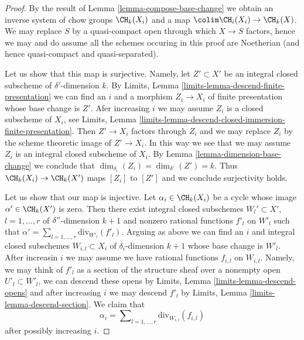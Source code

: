 \begin{proof}
By the result of Lemma \ref{lemma-compose-base-change} we obtain
an inverse system of chow groups $\CH_k(X_i)$ and a map
$\colim \CH_i(X_i) \to \CH_k(X)$.
We may replace $S$ by a quasi-compact open through which $X \to S$
factors, hence we may and do assume all the schemes occuring in
this proof are Noetherian (and hence quasi-compact and quasi-separated).

\medskip\noindent
Let us show that this map is surjective. Namely, let $Z' \subset X'$
be an integral closed subscheme of $\delta'$-dimension $k$. By
Limits, Lemma \ref{limits-lemma-descend-finite-presentation}
we can find an $i$ and a morphism $Z_i \to X_i$ of finite presentation
whose base change is $Z'$. Afer increasing $i$ we may assume $Z_i$
is a closed subscheme of $X_i$, see
Limits, Lemma \ref{limits-lemma-descend-closed-immersion-finite-presentation}.
Then $Z' \to X_i$ factors through $Z_i$ and we may replace $Z_i$
by the scheme theoretic image of $Z' \to X_i$. In this way we see
that we may assume $Z_i$ is an integral closed subscheme of $X_i$.
By Lemma \ref{lemma-dimension-base-change} we conclude that
$\dim_{\delta_i}(Z_i) = \dim_{\delta'}(Z') = k$.
Thus $\CH_k(X_i) \to \CH_k(X')$ maps $[Z_i]$ to $[Z']$ and
we conclude surjectivity holds.

\medskip\noindent
Let us show that our map is injective. Let $\alpha_i \in \CH_k(X_i)$
be a cycle whose image $\alpha' \in \CH_k(X')$ is zero.
Then there exist integral closed subschemes
$W_l' \subset X'$, $l = 1, \ldots, r$ of $\delta"$-dimension $k + 1$
and nonzero rational functions $f'_l$ on $W'_l$
such that $\alpha' = \sum_{l = 1, \ldots, r} \text{div}_{W'_l}(f'_l)$.
Arguing as above we can find an $i$ and integral closed subschemes
$W_{i, l} \subset X_i$ of $\delta_i$-dimension $k + 1$
whose base change is $W'_l$.
After increasin $i$ we may assume we have rational functions
$f_{i, l}$ on $W_{i, l}$. Namely, we may think of $f'_l$ as a
section of the structure sheaf over a nonempty open $U'_l \subset W'_l$,
we can descend these opens by Limits, Lemma \ref{limits-lemma-descend-opens}
and after increasing $i$ we may descend $f'_l$ by
Limits, Lemma \ref{limits-lemma-descend-section}.
We claim that
$$
\alpha_i = \sum\nolimits_{l = 1, \ldots, r} \text{div}_{W_{i, l}}(f_{i, l})
$$
after possibly increasing $i$.


\end{proof}

